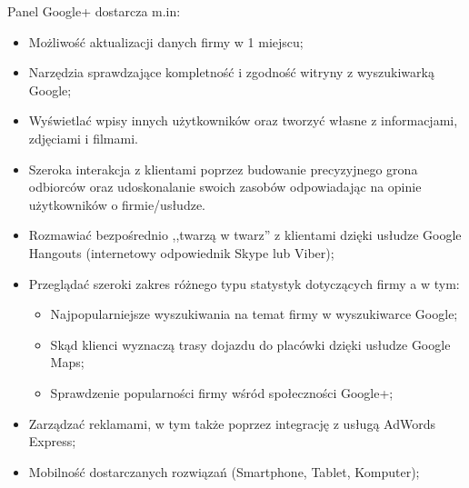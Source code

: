 Panel Google+ dostarcza m.in:

\begin{itemize}
\item Możliwość aktualizacji danych firmy w 1 miejscu;

\item Narzędzia sprawdzające kompletność i zgodność witryny z wyszukiwarką \mbox{Google};

\item Wyświetlać wpisy innych użytkowników oraz tworzyć własne z informacjami, zdjęciami i filmami.

\item Szeroka interakcja z klientami poprzez budowanie precyzyjnego grona odbiorców oraz udoskonalanie swoich zasobów odpowiadając na opinie użytkowników o firmie/usłudze.

\item Rozmawiać bezpośrednio ,,twarzą w twarz'' z klientami dzięki usłudze Google Hangouts (internetowy odpowiednik Skype lub Viber);

\item Przeglądać szeroki zakres różnego typu statystyk dotyczących firmy a w tym:
    \begin{itemize}
    \item Najpopularniejsze wyszukiwania na temat firmy w wyszukiwarce Google;
    \item Skąd klienci wyznaczą trasy dojazdu do placówki dzięki usłudze Google Maps;
    \item Sprawdzenie popularności firmy wśród społeczności Google+;
    \end{itemize}

\item Zarządzać reklamami, w tym także poprzez integrację z usługą AdWords Express;

\item Mobilność dostarczanych rozwiązań (Smartphone, Tablet, Komputer);
\end{itemize}


